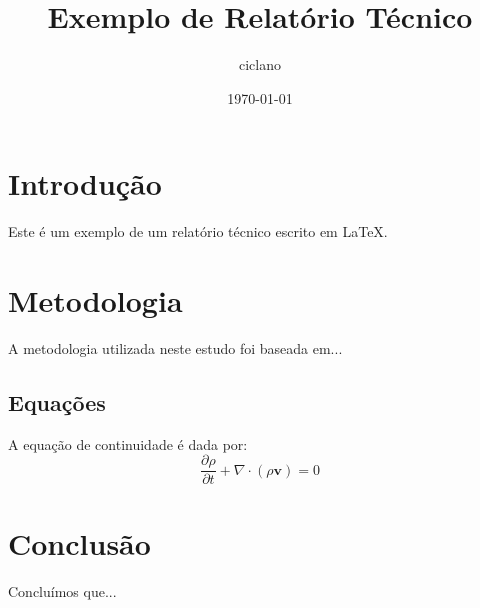 \documentclass{report}
\title{Exemplo de Relatório Técnico}
\author{ciclano}
\date{\today}
\begin{document}
	
	\maketitle
	
	\tableofcontents
	
	\chapter{Introdução}
	Este é um exemplo de um relatório técnico escrito em LaTeX.
	
	\chapter{Metodologia}
	A metodologia utilizada neste estudo foi baseada em...
	
	\section{Equações}
	A equação de continuidade é dada por:
	\[
	\frac{\partial \rho}{\partial t} + \nabla \cdot (\rho \mathbf{v}) = 0
	\]
	
	
	\chapter{Conclusão}
	Concluímos que...
	
\end{document}
